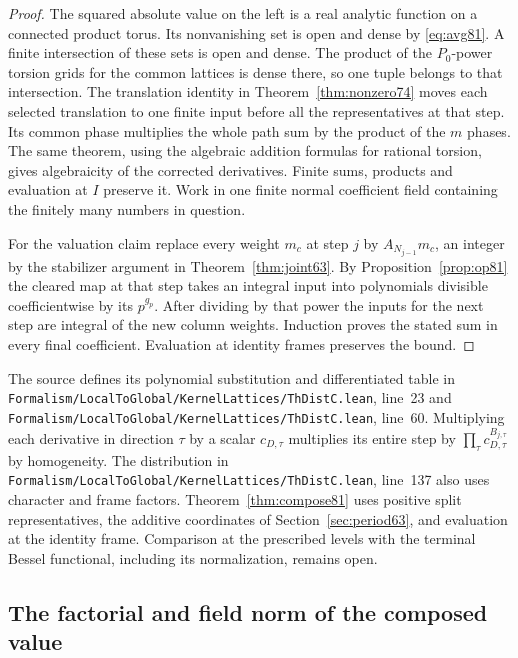 \documentclass[a4paper,11pt]{article}
\theoremstyle{definition}
\theoremstyle{remark}
\newcommand{\srcloc}[2]{{\small\nolinkurl{#1.lean}}, line~#2}
\numberwithin{equation}{section}
\begin{document}
\begin{proof}
The squared absolute value on the left is a real analytic
function on a connected product torus. Its nonvanishing set is
open and dense by \eqref{eq:avg81}. A finite intersection of
these sets is open and dense. The product of the \(P_0\)-power
torsion grids for the common lattices is dense there, so one
tuple belongs to that intersection. The translation identity
in Theorem~\ref{thm:nonzero74} moves each selected translation
to one finite input before all the representatives at that step.
Its common phase multiplies the whole path sum by the product
of the \(m\) phases. The same theorem, using the algebraic
addition formulas for rational torsion, gives algebraicity of
the corrected derivatives. Finite sums, products and evaluation
at \(I\) preserve it. Work in one finite normal coefficient field
containing the finitely many numbers in question.

For the valuation claim replace every weight \(m_c\) at step
\(j\) by \(A_{N_{j-1}}m_c\), an integer by the stabilizer argument
in Theorem~\ref{thm:joint63}. By Proposition~\ref{prop:op81} the
cleared map at that step takes an integral input into polynomials
divisible coefficientwise by its \(p^{g_p}\). After dividing by
that power the inputs for the next step are integral of the new
column weights. Induction proves the stated sum in every final
coefficient. Evaluation at identity frames preserves the bound.
\end{proof}

The source defines its polynomial substitution and differentiated
table in \srcloc{Formalism/LocalToGlobal/KernelLattices/ThDistC}{23}
and \srcloc{Formalism/LocalToGlobal/KernelLattices/ThDistC}{60}.
Multiplying each derivative in direction \(\tau\) by a scalar
\(c_{D,\tau}\) multiplies its entire step by
\(\prod_\tau c_{D,\tau}^{B_{j,\tau}}\) by homogeneity.
The distribution in
\srcloc{Formalism/LocalToGlobal/KernelLattices/ThDistC}{137} also
uses character and frame factors. Theorem~\ref{thm:compose81}
uses positive split representatives, the additive coordinates
of Section~\ref{sec:period63}, and evaluation at the identity
frame. Comparison at the prescribed levels with the terminal
Bessel functional, including its normalization, remains open.

\subsection{The factorial and field norm of the composed value}\label{nav:VI-03}
\label{sec:fischer83}
\end{document}
